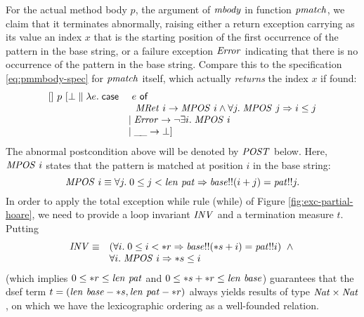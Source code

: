 For the actual method body $p$, \IE the argument of $\mathit{mbody}$ in function
$\mathit{pmatch}$, we claim that it terminates abnormally, raising either a return
exception carrying as its value an index $x$ that is the starting position of
the first occurrence of the pattern in the base string, or a failure exception
$\mathit{Error}$ indicating that there is no occurrence of the pattern in the base
string. Compare this to the specification \eqref{eq:pmmbody-spec} for
$\mathit{pmatch}$ itself, which actually \emph{returns} the index $x$ if found:
\begin{equation}
\label{eq:pmatchspec}
\begin{array}{ll}
[]~ p~ [\bot \parallel \lambda e.\; \mathsf{case}&\ e\ \mathsf{of} \\
 & \hspace{0.7em}\mathit{MRet}\ i \to \mathit{MPOS}\ i \land
    \forall j.\; \mathit{MPOS}\ j\Rightarrow i\leq j\\
 &  \mid \mathit{Error} \to \lnot \exists i.\; \mathit{MPOS}\ i\\
 &  \mid \_\!\_ \to \bot]
\end{array}
\end{equation}
The abnormal postcondition above will be denoted by $\mathit{POST}$ below. Here,
$\mathit{MPOS}\ i$ states that the pattern is matched at position $i$ in the
base string:
\begin{equation*}
\mathit{MPOS}\ i \equiv \forall j.\; 0 \leq j < \mathit{len}~\mathit{pat} \Rightarrow
\mathit{base}!!(i+j) = \mathit{pat}!!j.
\end{equation*}
In order to apply the total exception while rule (while) of Figure
\ref{fig:exc-partial-hoare}, we need to provide a loop invariant $\mathit{INV}$ and
a termination measure $t$.  Putting
\begin{equation*}
\begin{array}{ll}
\mathit{INV} \equiv 
      & (\forall i.\; 0 \leq i < {\ast r} \Rightarrow 
       \mathit{base}!!({\ast s}+i) = \mathit{pat}!!i)\ \land {}\\
      & \forall i.\; \mathit{MPOS}\ i \Rightarrow {\ast s} \leq i 
\end{array}
\end{equation*}
(which implies $0 \leq {\ast r} \leq \mathit{len}~\mathit{pat}$ and $0\leq
{\ast s} + {\ast r} \leq \mathit{len}~\mathit{base}$) guarantees that the
dsef term \(t = (\mathit{len}~\mathit{base} - {\ast s},
\mathit{len}~\mathit{pat} - {\ast r})\) always yields results of type
$\mathit{Nat} \times \mathit{Nat}$, on which we have the lexicographic ordering
as a well-founded relation.

